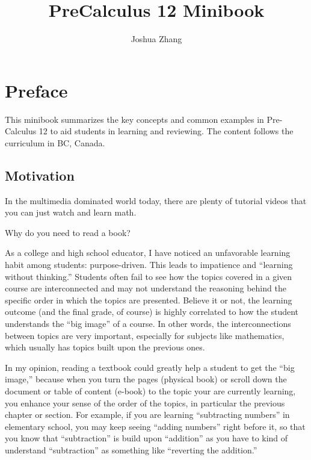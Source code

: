 \documentclass[
]{book}
\title{PreCalculus 12 Minibook}
\author{Joshua Zhang}
\date{}
\theoremstyle{definition}
\theoremstyle{definition}
\theoremstyle{definition}
\theoremstyle{definition}
\theoremstyle{remark}
\begin{document}
\maketitle

{
\setcounter{tocdepth}{1}
\tableofcontents
}
\hypertarget{preface}{%
\chapter*{Preface}\label{preface}}

This minibook summarizes the key concepts and common examples in Pre-Calculus 12 to aid students in learning and reviewing. The content follows the curriculum in BC, Canada.

\hypertarget{motivation}{%
\section*{Motivation}\label{motivation}}

In the multimedia dominated world today, there are plenty of tutorial videos that you can just watch and learn math.

Why do you need to read a book?

As a college and high school educator, I have noticed an unfavorable learning habit among students: purpose-driven. This leads to impatience and ``learning without thinking.'' Students often fail to see how the topics covered in a given course are interconnected and may not understand the reasoning behind the specific order in which the topics are presented. Believe it or not, the learning outcome (and the final grade, of course) is highly correlated to how the student understands the ``big image'' of a course. In other words, the interconnections between topics are very important, especially for subjects like mathematics, which usually has topics built upon the previous ones.

In my opinion, reading a textbook could greatly help a student to get the ``big image,'' because when you turn the pages (physical book) or scroll down the document or table of content (e-book) to the topic your are currently learning, you enhance your sense of the order of the topics, in particular the previous chapter or section. For example, if you are learning ``subtracting numbers'' in elementary school, you may keep seeing ``adding numbers'' right before it, so that you know that ``subtraction'' is build upon ``addition'' as you have to kind of understand ``subtraction'' as something like ``reverting the addition.''
\end{document}
